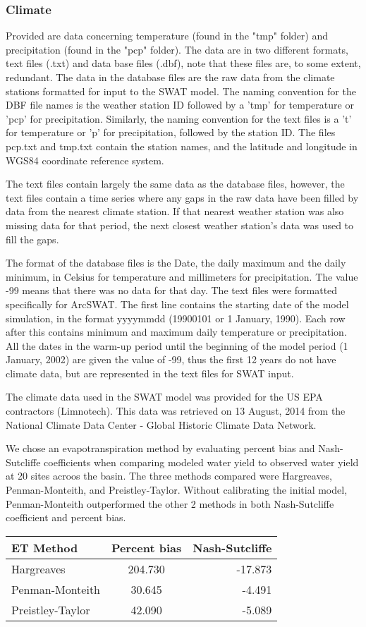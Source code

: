 \subsubsection{Climate}	

Provided are data concerning temperature (found in the "tmp" folder) and precipitation	(found in the "pcp" folder). The data are in two different formats, text files (.txt) and data base files (.dbf),	note that these files are, to some extent, redundant. The data in the database files are the raw data from the climate stations formatted for input to the SWAT model. The naming convention for the DBF file names is the weather station ID followed by a 'tmp' for temperature or 'pcp' for precipitation.	Similarly, the naming convention for the text files is a 't' for temperature or 'p' for precipitation, followed by the station ID. The files pcp.txt and tmp.txt contain the station names, and the latitude and longitude in WGS84 coordinate reference system.

The text files contain largely the same data as the database files, however, the text files contain a time series where any gaps in the raw data have been filled by data from the nearest climate station. If that nearest weather station was also missing data for that period, the next closest weather station's data was used to fill the gaps. 

The format of the database files is the Date, the daily maximum and the daily minimum, in Celsius for temperature and millimeters for precipitation. The value -99 means that there was no data for that day. The text files were formatted specifically for ArcSWAT. The first line contains the starting date of the model simulation, in the format yyyymmdd (19900101 or 1 January, 1990). Each row after this contains minimum and maximum daily temperature or precipitation. All the dates in the warm-up period until the beginning of the model period (1 January, 2002) are given the value of -99, thus the first 12 years do not have climate data, but are represented in the text files for SWAT input. 

The climate data used in the SWAT model was provided for the US EPA contractors (Limnotech). This data was retrieved on 13 August, 2014 from the National Climate Data Center - Global Historic Climate Data Network.

We chose an evapotranspiration method by evaluating percent bias and Nash-Sutcliffe coefficients when comparing modeled water yield to observed water yield at 20 sites acroos the basin. The three methods compared were Hargreaves, Penman-Monteith, and Preistley-Taylor. Without calibrating the initial model, Penman-Monteith outperformed the other 2 methods in both Nash-Sutcliffe coefficient and percent bias. 

\begin{tabular}{ l c r }
ET Method         &	Percent bias & Nash-Sutcliffe \\
\hline	\hline
Hargreaves        &	204.730	& 	-17.873	\\
Penman-Monteith	  &	30.645	&	-4.491 	\\
Preistley-Taylor  &	42.090	&	-5.089 	\\
\end{tabular}